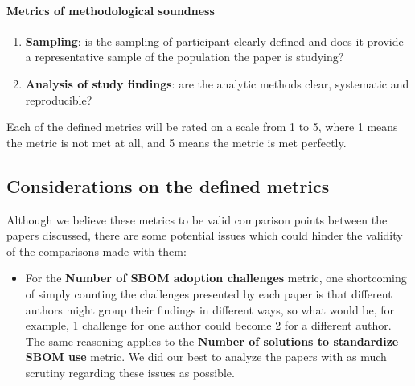 \paragraph{Metrics of methodological soundness}
\begin{enumerate}
    \item \textbf{Sampling}: is the sampling of participant clearly defined and does it provide a representative sample of the population the paper is studying?
    \item \textbf{Analysis of study findings}: are the analytic methods clear, systematic and reproducible?
\end{enumerate}

Each of the defined metrics will be rated on a scale from 1 to 5, where 1 means the metric is not met at all, and 5 means the metric is met perfectly.

\subsection{Considerations on the defined metrics}

\noindent Although we believe these metrics to be valid comparison points between the papers discussed, there are some potential issues which could hinder the validity of the comparisons made with them:
\begin{itemize}
    \item For the \textbf{Number of SBOM adoption challenges} metric, one shortcoming of simply counting the challenges presented by each paper is that different authors might group their findings in different ways, so what would be, for example, 1 challenge for one author could become 2 for a different author. The same reasoning applies to the \textbf{Number of solutions to standardize SBOM use} metric. We did our best to analyze the papers with as much scrutiny regarding these issues as possible.
\end{itemize}
